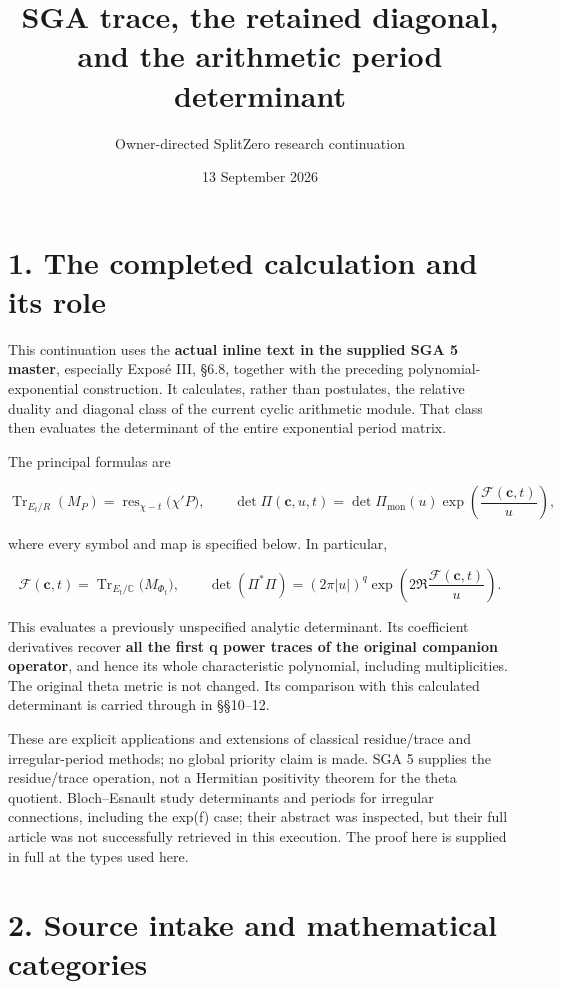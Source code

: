 \documentclass[
  11pt,
]{article}
\title{SGA trace, the retained diagonal, and the arithmetic period
determinant}
\author{Owner-directed SplitZero research continuation}
\date{13 September 2026}
\begin{document}
\maketitle

\section{1. The completed calculation and its
role}\label{the-completed-calculation-and-its-role}

This continuation uses the \textbf{actual inline text in the supplied
SGA 5 master}, especially Exposé III, §6.8, together with the preceding
polynomial-exponential construction. It calculates, rather than
postulates, the relative duality and diagonal class of the current
cyclic arithmetic module. That class then evaluates the determinant of
the entire exponential period matrix.

The principal formulas are

\[
\operatorname{Tr}_{E_t/R}(M_P)
 =\operatorname{res}_{\chi-t}\bigl(\chi'P\bigr),
\qquad
\det\Pi(\mathbf c,u,t)
 =\det\Pi_{\mathrm{mon}}(u)\exp\!\left(\frac{\mathcal F(\mathbf c,t)}u\right),
\tag{1}
\]

where every symbol and map is specified below. In particular,

\[
\mathcal F(\mathbf c,t)
 =\operatorname{Tr}_{E_t/\mathbb C}\bigl(M_{\Phi_t}\bigr),
\qquad
\det(\Pi^*\Pi)
 =(2\pi|u|)^q\exp\!\left(2\Re\frac{\mathcal F(\mathbf c,t)}u\right).
\tag{2}
\]

This evaluates a previously unspecified analytic determinant. Its
coefficient derivatives recover \textbf{all the first q power traces of
the original companion operator}, and hence its whole characteristic
polynomial, including multiplicities. The original theta metric is not
changed. Its comparison with this calculated determinant is carried
through in §§10--12.

These are explicit applications and extensions of classical
residue/trace and irregular-period methods; no global priority claim is
made. SGA 5 supplies the residue/trace operation, not a Hermitian
positivity theorem for the theta quotient. Bloch--Esnault study
determinants and periods for irregular connections, including the exp(f)
case; their abstract was inspected, but their full article was not
successfully retrieved in this execution. The proof here is supplied in
full at the types used here.

\section{2. Source intake and mathematical
categories}\label{source-intake-and-mathematical-categories}
\end{document}

